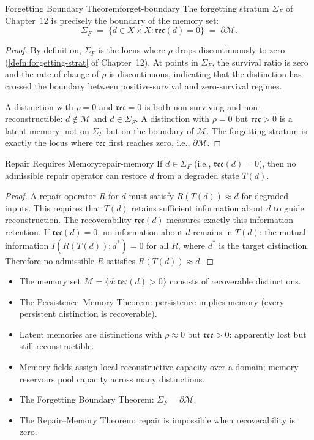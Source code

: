 \documentclass[12pt,twoside,openright]{book}
\newcommand{\reco}{\mathfrak{rec}}        %
\newcommand{\survRatio}{\rho}             %
\newcommand{\strataF}{\Sigma_{F}}   %
\newenvironment{chapsummary}{%
  \begin{tcolorbox}[colback=DistBlue!5,colframe=DistBlue,
    title={\faBookOpen\enspace Summary},
    fonttitle=\sffamily\bfseries\color{white},
    attach boxed title to top left={yshift=-2mm,xshift=4mm},
    boxed title style={colback=DistBlue,rounded corners}]
  \begin{itemize}[nosep,leftmargin=*]}{%
  \end{itemize}\end{tcolorbox}}
\providecommand{\strataF}{\Sigma_{F}}
\providecommand{\memSet}{\mathcal{M}}
\begin{document}
\begin{theorem}{Forgetting Boundary Theorem}{forget-boundary}
The forgetting stratum $\strataF$ of Chapter~12 is precisely
the boundary of the memory set:
\[
  \strataF
  \;=\;
  \bigl\{d\in X\times X : \reco(d)=0\bigr\}
  \;=\;
  \partial\memSet.
\]
\begin{proof}
By definition, $\strataF$ is the locus where $\survRatio$ drops
discontinuously to zero (\cref{defn:forgetting-strat} of
Chapter~12). At points in $\strataF$, the survival ratio is
zero and the rate of change of $\survRatio$ is discontinuous,
indicating that the distinction has crossed the boundary
between positive-survival and zero-survival regimes.

A distinction with $\survRatio=0$ and $\reco=0$ is both
non-surviving and non-reconstructible: $d\notin\memSet$ and
$d\in\strataF$. A distinction with $\survRatio=0$ but $\reco>0$
is a latent memory: not on $\strataF$ but on the boundary of
$\memSet$. The forgetting stratum is exactly the locus where
$\reco$ first reaches zero, i.e., $\partial\memSet$.
\end{proof}
\end{theorem}

\begin{theorem}{Repair Requires Memory}{repair-memory}
If $d\in\strataF$ (i.e., $\reco(d)=0$), then no admissible
repair operator can restore $d$ from a degraded state $T(d)$.
\begin{proof}
A repair operator $R$ for $d$ must satisfy $R(T(d))\approx d$
for degraded inputs. This requires that $T(d)$ retains
sufficient information about $d$ to guide reconstruction. The
recoverability $\reco(d)$ measures exactly this information
retention. If $\reco(d)=0$, no information about $d$ remains
in $T(d)$: the mutual information $I(R(T(d));d^*)=0$ for all
$R$, where $d^*$ is the target distinction. Therefore no
admissible $R$ satisfies $R(T(d))\approx d$.
\end{proof}
\end{theorem}

\begin{chapsummary}
\item The memory set $\memSet=\{d:\reco(d)>0\}$ consists of
  recoverable distinctions.
\item The Persistence–Memory Theorem: persistence implies memory
  (every persistent distinction is recoverable).
\item Latent memories are distinctions with $\survRatio\approx0$
  but $\reco>0$: apparently lost but still reconstructible.
\item Memory fields assign local reconstructive capacity over
  a domain; memory reservoirs pool capacity across many
  distinctions.
\item The Forgetting Boundary Theorem: $\strataF=\partial\memSet$.
\item The Repair–Memory Theorem: repair is impossible when
  recoverability is zero.
\end{chapsummary}
\end{document}
